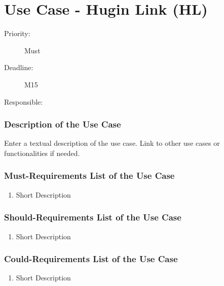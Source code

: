 \newpage
\section{Use Case - Hugin Link (HL)}
\label{UseCase:HL}

\begin{description}
\item[Priority:] Must
\item[Deadline:] M15
\item[Responsible:]
\end{description}

\subsubsection*{Description of the Use Case}

Enter a textual description of the use case. Link to other use cases or functionalities if needed. 


\subsubsection*{Must-Requirements List of the Use Case}

\begin{enumerate}
\item Short Description
\end{enumerate}

\subsubsection*{Should-Requirements List of the Use Case}

\begin{enumerate}
\item Short Description
\end{enumerate}

\subsubsection*{Could-Requirements List of the Use Case}

\begin{enumerate}
\item Short Description
\end{enumerate}

